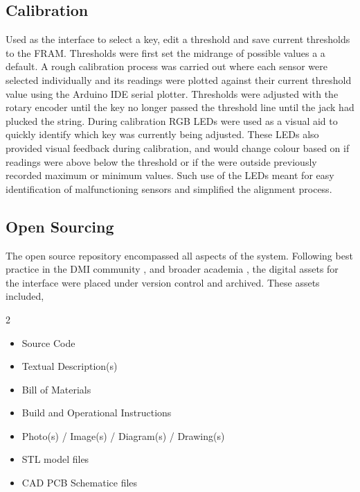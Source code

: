 \subsection{Calibration}

Used as the interface to select a key, edit a threshold and
save current thresholds to the FRAM. Thresholds were first set the midrange of
possible values a a default. A rough calibration process was carried out where
each sensor were selected individually and its readings were plotted against
their current threshold value using the Arduino IDE serial plotter. Thresholds
were adjusted with the rotary encoder until the key no longer passed the
threshold line until the jack had plucked the string. During calibration RGB
LEDs were used as a visual aid to quickly identify which key was currently being
adjusted. These LEDs also provided visual feedback during calibration, and would
change colour based on if readings were above below the threshold or if the were
outside previously recorded maximum or minimum values. Such use of the LEDs
meant for easy identification of malfunctioning sensors and simplified the
alignment process. 

\subsection{Open Sourcing}

The open source repository encompassed all aspects of the system.
Following best practice in the DMI community \cite{calegario_documentation_2021}, and broader academia \cite{stall_journal_2023}, the digital assets for the interface were placed under version control and archived. These assets included,

\begin{multicols}{2}
\begin{itemize}
  \item Source Code
  \item Textual Description(s)
  \item Bill of Materials
  \item Build and Operational Instructions
  \item Photo(s) / Image(s) / Diagram(s) / Drawing(s)
  \item STL model files
  \item CAD PCB Schematice files
\end{itemize}
\end{multicols}

